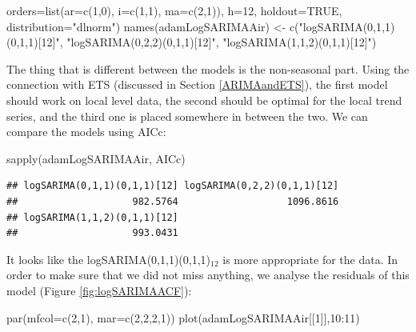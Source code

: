 \documentclass[
]{book}
\newenvironment{Shaded}{\begin{snugshade}}{\end{snugshade}}
\newcommand{\AttributeTok}[1]{\textcolor[rgb]{0.77,0.63,0.00}{#1}}
\newcommand{\ConstantTok}[1]{\textcolor[rgb]{0.00,0.00,0.00}{#1}}
\newcommand{\DecValTok}[1]{\textcolor[rgb]{0.00,0.00,0.81}{#1}}
\newcommand{\FunctionTok}[1]{\textcolor[rgb]{0.00,0.00,0.00}{#1}}
\newcommand{\NormalTok}[1]{#1}
\newcommand{\OtherTok}[1]{\textcolor[rgb]{0.56,0.35,0.01}{#1}}
\newcommand{\SpecialCharTok}[1]{\textcolor[rgb]{0.00,0.00,0.00}{#1}}
\newcommand{\StringTok}[1]{\textcolor[rgb]{0.31,0.60,0.02}{#1}}
\theoremstyle{definition}
\theoremstyle{definition}
\theoremstyle{definition}
\theoremstyle{definition}
\theoremstyle{remark}
\begin{document}
\begin{Shaded}
\begin{Highlighting}[]
       \AttributeTok{orders=}\FunctionTok{list}\NormalTok{(}\AttributeTok{ar=}\FunctionTok{c}\NormalTok{(}\DecValTok{1}\NormalTok{,}\DecValTok{0}\NormalTok{), }\AttributeTok{i=}\FunctionTok{c}\NormalTok{(}\DecValTok{1}\NormalTok{,}\DecValTok{1}\NormalTok{), }\AttributeTok{ma=}\FunctionTok{c}\NormalTok{(}\DecValTok{2}\NormalTok{,}\DecValTok{1}\NormalTok{)),}
       \AttributeTok{h=}\DecValTok{12}\NormalTok{, }\AttributeTok{holdout=}\ConstantTok{TRUE}\NormalTok{, }\AttributeTok{distribution=}\StringTok{"dlnorm"}\NormalTok{)}
\FunctionTok{names}\NormalTok{(adamLogSARIMAAir) }\OtherTok{\textless{}{-}} \FunctionTok{c}\NormalTok{(}\StringTok{"logSARIMA(0,1,1)(0,1,1)[12]"}\NormalTok{,}
                             \StringTok{"logSARIMA(0,2,2)(0,1,1)[12]"}\NormalTok{,}
                             \StringTok{"logSARIMA(1,1,2)(0,1,1)[12]"}\NormalTok{)}
\end{Highlighting}
\end{Shaded}

The thing that is different between the models is the non-seasonal part. Using the connection with ETS (discussed in Section \ref{ARIMAandETS}), the first model should work on local level data, the second should be optimal for the local trend series, and the third one is placed somewhere in between the two. We can compare the models using AICc:

\begin{Shaded}
\begin{Highlighting}[]
\FunctionTok{sapply}\NormalTok{(adamLogSARIMAAir, AICc)}
\end{Highlighting}
\end{Shaded}

\begin{verbatim}
## logSARIMA(0,1,1)(0,1,1)[12] logSARIMA(0,2,2)(0,1,1)[12] 
##                    982.5764                   1096.8616 
## logSARIMA(1,1,2)(0,1,1)[12] 
##                    993.0431
\end{verbatim}

It looks like the logSARIMA(0,1,1)(0,1,1)\(_{12}\) is more appropriate for the data. In order to make sure that we did not miss anything, we analyse the residuals of this model (Figure \ref{fig:logSARIMAACF}):

\begin{Shaded}
\begin{Highlighting}[]
\FunctionTok{par}\NormalTok{(}\AttributeTok{mfcol=}\FunctionTok{c}\NormalTok{(}\DecValTok{2}\NormalTok{,}\DecValTok{1}\NormalTok{), }\AttributeTok{mar=}\FunctionTok{c}\NormalTok{(}\DecValTok{2}\NormalTok{,}\DecValTok{2}\NormalTok{,}\DecValTok{2}\NormalTok{,}\DecValTok{1}\NormalTok{))}
\FunctionTok{plot}\NormalTok{(adamLogSARIMAAir[[}\DecValTok{1}\NormalTok{]],}\DecValTok{10}\SpecialCharTok{:}\DecValTok{11}\NormalTok{)}
\end{Highlighting}
\end{Shaded}
\end{document}
